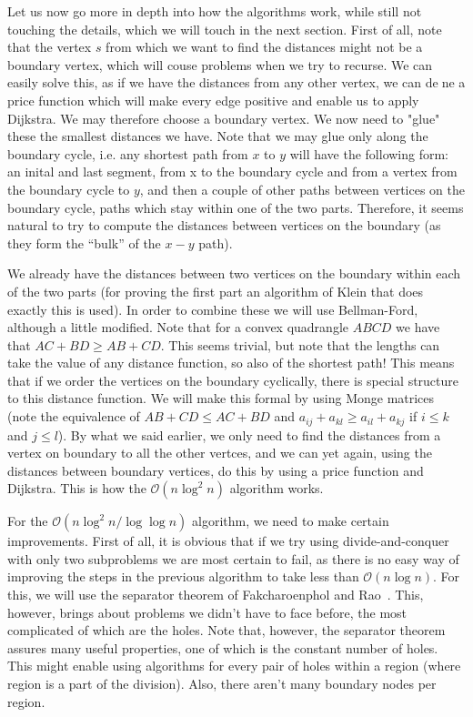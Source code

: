 \documentclass[11pt]{article}
\begin{document}
Let us now go more in depth into how the algorithms work, while still not touching the details, which we will touch in the next section. First of all, note that the vertex $s$ from which we want to find the distances might not be a boundary vertex, which will couse problems when we try to recurse. We can easily solve this, as if we have the distances from any other vertex, we can dene a price function which will make every edge positive and enable us to apply Dijkstra. We may therefore choose a boundary vertex. We now need to "glue" these the smallest distances we have. Note that we may glue only along the boundary cycle, i.e. any shortest path from $x$ to $y$ will have the following form: an inital and last segment, from x to the boundary cycle and from a vertex from the boundary cycle to $y$, and then a couple of other paths between vertices on the boundary cycle, paths which stay within one of the two parts. Therefore, it seems natural to try to compute the distances between vertices on the boundary (as they form the ``bulk'' of the $x-y$ path).

We already have the distances between two vertices on the boundary within each of the two parts (for proving the first part an algorithm of Klein that does exactly this is used). In order to combine these we will use Bellman-Ford, although a little modified. Note that for a convex quadrangle $ABCD$ we have that $AC + BD \geq AB + CD$. This seems trivial, but note that the lengths can take the value of any distance function, so also of the shortest path! This means that if we order the vertices on the boundary cyclically, there is special structure to this distance function. We will make this formal by using Monge matrices (note the equivalence of $AB + CD \leq AC + BD$ and $a_{ij} + a_{kl} \geq a_{il} + a_{kj}$ if $i \leq k$ and $j \leq l$). By what we said earlier, we only need to find the distances from a vertex on boundary to all the other vertces, and we can yet again, using the distances between boundary vertices, do this by using a price function and Dijkstra. This is how the $\mathcal{O}(n \log^2 n)$ algorithm works.

For the $\mathcal{O}(n \log^2 n/ \log \log n)$ algorithm, we need to make certain improvements. First of all, it is obvious that if we try using divide-and-conquer with only two subproblems we are most certain to fail, as there is no easy way of improving the steps in the previous algorithm to take less than $\mathcal{O}(n \log n)$. For this, we will use the separator theorem of Fakcharoenphol and Rao~\cite{fakcharoenphol2001planar}. This, however, brings about problems we didn’t have to face before, the most complicated of which are the holes. Note that, however, the separator theorem assures many useful properties, one of which is the constant number of holes. This might enable using algorithms for every pair of holes within a region (where region is a part of the division). Also, there aren’t many boundary nodes per region.
\end{document}

